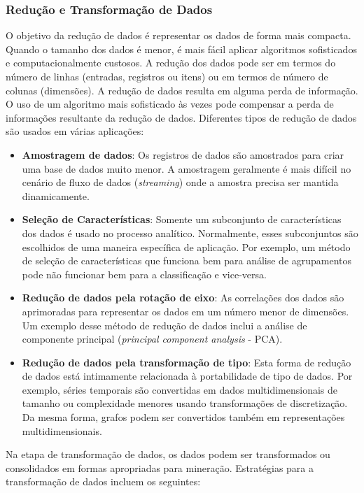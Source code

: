 \subsubsection{Redução e Transformação de Dados}
O objetivo da redução de dados é representar os dados de forma mais compacta. Quando o tamanho dos dados é menor, é mais fácil aplicar algoritmos sofisticados e computacionalmente custosos. A redução dos dados pode ser em termos do número de linhas (entradas, registros ou itens) ou em termos de número de colunas (dimensões). A redução de dados resulta em alguma perda de informação. O uso de um algoritmo mais sofisticado às vezes pode compensar a perda de informações resultante da redução de dados. Diferentes tipos de redução de dados são usados em várias aplicações:

\begin{itemize}
  \item 
\textbf{Amostragem de dados}: Os registros de dados são amostrados para criar uma base de dados muito menor. A amostragem geralmente é mais difícil no cenário de fluxo de dados (\textit{streaming}) onde a amostra precisa ser mantida dinamicamente.
  \item 
\textbf{Seleção de Características}: Somente um subconjunto de características dos dados é usado no processo analítico. Normalmente, esses subconjuntos são escolhidos de uma maneira específica de aplicação. Por exemplo, um método de seleção de características que funciona bem para análise de agrupamentos pode não funcionar bem para a classificação e vice-versa.
  \item 
\textbf{Redução de dados pela rotação de eixo}: As correlações dos dados são aprimoradas para representar os dados em um número menor de dimensões. Um exemplo desse método de redução de dados inclui  a análise de componente principal (\textit{principal component analysis }- PCA).
  \item 
\textbf{Redução de dados pela transformação de tipo}: Esta forma de redução de dados está intimamente relacionada à portabilidade de tipo de dados. Por exemplo, séries temporais são convertidas em dados multidimensionais de tamanho ou complexidade menores usando transformações de discretização. Da mesma forma, grafos podem ser convertidos também em representações multidimensionais.
\end{itemize}

Na etapa de transformação de dados, os dados podem ser transformados ou consolidados em formas apropriadas para mineração. Estratégias para a transformação de dados incluem os seguintes:

